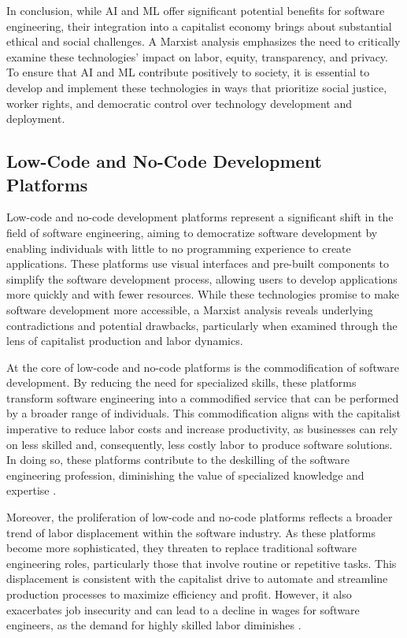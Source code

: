 \begin{refsection}
In conclusion, while AI and ML offer significant potential benefits for software engineering, their integration into a capitalist economy brings about substantial ethical and social challenges. A Marxist analysis emphasizes the need to critically examine these technologies' impact on labor, equity, transparency, and privacy. To ensure that AI and ML contribute positively to society, it is essential to develop and implement these technologies in ways that prioritize social justice, worker rights, and democratic control over technology development and deployment.

\subsection{Low-Code and No-Code Development Platforms}

Low-code and no-code development platforms represent a significant shift in the field of software engineering, aiming to democratize software development by enabling individuals with little to no programming experience to create applications. These platforms use visual interfaces and pre-built components to simplify the software development process, allowing users to develop applications more quickly and with fewer resources. While these technologies promise to make software development more accessible, a Marxist analysis reveals underlying contradictions and potential drawbacks, particularly when examined through the lens of capitalist production and labor dynamics.

At the core of low-code and no-code platforms is the commodification of software development. By reducing the need for specialized skills, these platforms transform software engineering into a commodified service that can be performed by a broader range of individuals. This commodification aligns with the capitalist imperative to reduce labor costs and increase productivity, as businesses can rely on less skilled and, consequently, less costly labor to produce software solutions. In doing so, these platforms contribute to the deskilling of the software engineering profession, diminishing the value of specialized knowledge and expertise \cite[pp.~110-113]{fuchs2014digital}.

Moreover, the proliferation of low-code and no-code platforms reflects a broader trend of labor displacement within the software industry. As these platforms become more sophisticated, they threaten to replace traditional software engineering roles, particularly those that involve routine or repetitive tasks. This displacement is consistent with the capitalist drive to automate and streamline production processes to maximize efficiency and profit. However, it also exacerbates job insecurity and can lead to a decline in wages for software engineers, as the demand for highly skilled labor diminishes \cite[pp.~56-59]{marx2008capital}.


\end{refsection}
